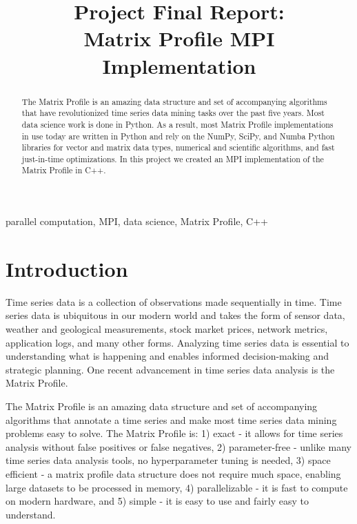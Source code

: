 \documentclass[conference]{IEEEtran}
\begin{document}
\title{Project Final Report:\\Matrix Profile MPI Implementation}

\author{
}


\maketitle
\begin{abstract}
The Matrix Profile is an amazing data structure and set of accompanying algorithms that have revolutionized time series data mining tasks over the past five years.  Most data science work is done in Python.  As a result, most Matrix Profile implementations in use today are written in Python and rely on the NumPy, SciPy, and Numba Python libraries for vector and matrix data types, numerical and scientific algorithms, and fast just-in-time optimizations.  In this project we created an MPI implementation of the Matrix Profile in C++.
\end{abstract}

\begin{IEEEkeywords}
parallel computation, MPI, data science, Matrix Profile, C++
\end{IEEEkeywords}


\section{Introduction}
Time series data is a collection of observations made sequentially in time.  Time series data is ubiquitous in our modern world and takes the form of sensor data, weather and geological measurements, stock market prices, network metrics, application logs, and many other forms.  Analyzing time series data is essential to understanding what is happening and enables informed decision-making and strategic planning.  One recent advancement in time series data analysis is the Matrix Profile\cite{MatrixProfile1}. 

The Matrix Profile is an amazing data structure and set of accompanying algorithms that annotate a time series and make most time series data mining problems easy to solve\cite{MatrixProfile2}. The Matrix Profile is:  1) exact - it allows for time series analysis without false positives or false negatives, 2) parameter-free - unlike many time series data analysis tools, no hyperparameter tuning is needed, 3) space efficient - a matrix profile data structure does not require much space, enabling large datasets to be processed in memory, 4) parallelizable - it is fast to compute on modern hardware, and 5) simple - it is easy to use and fairly easy to understand\cite{Keogh}.   
\end{document}
